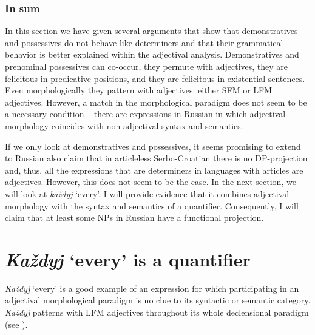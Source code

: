 \documentclass[output=paper,
colorlinks,
citecolor=brown,
newtxmath
]{langscibook}
\begin{document}
\subsubsection{In sum}

In this section we have given several arguments that show that demonstratives and possessives do not behave like determiners and that their grammatical behavior is better explained within the adjectival analysis. Demonstratives and prenominal possessives can co-occur, they permute with adjectives, they are felicitous in predicative positions, and they are felicitous in existential sentences. Even morphologically they pattern with adjectives: either SFM or LFM adjectives. However, a match in the morphological paradigm does not seem to be a necessary condition -- there are expressions in Russian in which adjectival morphology coincides with non-adjectival syntax and semantics.

If we only look at demonstratives and possessives, it seems promising to extend to Russian also   claim that in articleless Serbo-Croatian there is no DP-projection and, thus, all the expressions that are determiners in languages with articles are adjectives. 
However, this does not seem to be the case. In the next section, we will look at \textit{každyj} `every'. I will provide evidence that it combines adjectival morphology with the syntax and semantics of a quantifier. Consequently, I will claim that at least some NPs in Russian have a functional projection.
%
%
\section{\textit{Každyj} `every' is a quantifier}\label{sec:3_kazdyj}

\textit{Každyj} `every' is a good example of an expression for which participating in an adjectival morphological paradigm is no clue to its syntactic or semantic category. \textit{Každyj} patterns with LFM adjectives throughout its whole declensional paradigm (see ).
\end{document}
